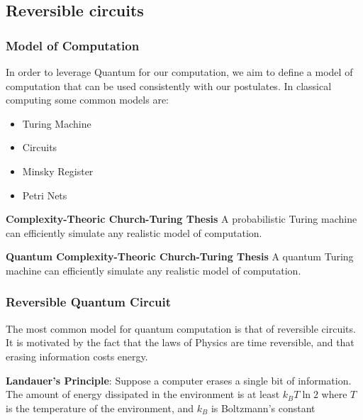 \documentclass{beamer}
\begin{document}
    \subsection{Reversible circuits}
    \begin{frame}
        \frametitle{Model of Computation}
        In order to leverage Quantum for our computation, we aim to define a model of computation 
        that can be used consistently with our postulates. In classical computing some common models are:
        \begin{itemize}
            \item Turing Machine
            \item Circuits
            \item Minsky Register
            \item Petri Nets
        \end{itemize}
        \begin{definition}
            \textbf{Complexity-Theoric Church-Turing Thesis} 
            A probabilistic Turing machine can efficiently simulate any realistic model of computation.
        \end{definition}
        \begin{definition}
            \textbf{Quantum Complexity-Theoric Church-Turing Thesis} 
            A quantum Turing machine can efficiently simulate any realistic model of computation.
        \end{definition}
    \end{frame}
    \begin{frame}
        \frametitle{Reversible Quantum Circuit}
        The most common model for quantum computation is that of reversible circuits.
        It is motivated by the fact that the laws of Physics are time reversible, and that
        erasing information costs energy.
        \begin{definition}
            \textbf{Landauer's Principle}: Suppose a computer erases a single bit of information.
            The amount of energy dissipated in the environment is at least $k_B T \ln 2$ where 
            $T$ is the temperature of the environment, and $k_B$ is Boltzmann's constant
        \end{definition}
    \end{frame}
\end{document}
